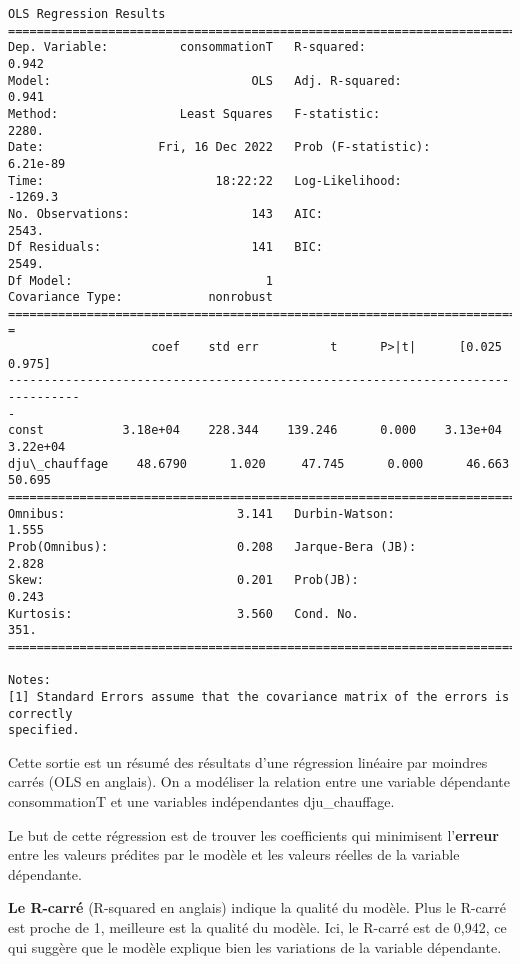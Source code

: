 \documentclass[11pt]{article}
\begin{document}
    \begin{Verbatim}[commandchars=\\\{\}]
                            OLS Regression Results
==============================================================================
Dep. Variable:          consommationT   R-squared:                       0.942
Model:                            OLS   Adj. R-squared:                  0.941
Method:                 Least Squares   F-statistic:                     2280.
Date:                Fri, 16 Dec 2022   Prob (F-statistic):           6.21e-89
Time:                        18:22:22   Log-Likelihood:                -1269.3
No. Observations:                 143   AIC:                             2543.
Df Residuals:                     141   BIC:                             2549.
Df Model:                           1
Covariance Type:            nonrobust
================================================================================
=
                    coef    std err          t      P>|t|      [0.025
0.975]
--------------------------------------------------------------------------------
-
const           3.18e+04    228.344    139.246      0.000    3.13e+04
3.22e+04
dju\_chauffage    48.6790      1.020     47.745      0.000      46.663
50.695
==============================================================================
Omnibus:                        3.141   Durbin-Watson:                   1.555
Prob(Omnibus):                  0.208   Jarque-Bera (JB):                2.828
Skew:                           0.201   Prob(JB):                        0.243
Kurtosis:                       3.560   Cond. No.                         351.
==============================================================================

Notes:
[1] Standard Errors assume that the covariance matrix of the errors is correctly
specified.
    \end{Verbatim}

    Cette sortie est un résumé des résultats d'une régression linéaire par
moindres carrés (OLS en anglais). On a modéliser la relation entre une
variable dépendante consommationT et une variables indépendantes
dju\_chauffage.

Le but de cette régression est de trouver les coefficients qui
minimisent l'\textbf{erreur} entre les valeurs prédites par le modèle et
les valeurs réelles de la variable dépendante.

\textbf{Le R-carré} (R-squared en anglais) indique la qualité du modèle.
Plus le R-carré est proche de 1, meilleure est la qualité du modèle.
Ici, le R-carré est de 0,942, ce qui suggère que le modèle explique bien
les variations de la variable dépendante.
\end{document}
